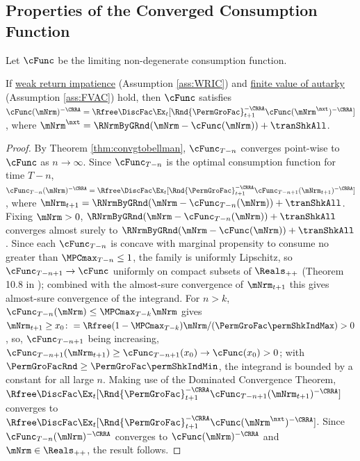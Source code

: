 \documentclass[\econtexRoot/BufferStockTheory]{subfiles}
\begin{document}
\subsection{Properties of the Converged Consumption Function}\label{subsec:Properties}

Let $\cFunc$ be the limiting non-degenerate consumption function.

\begin{claim}\label{eq:EuelrStatC}
If \hyperlink{WRIC}{weak return impatience} (Assumption \ref{ass:WRIC}) and \hyperlink{FVAC}{finite value of autarky} (Assumption \ref{ass:FVAC}) hold, then $\cFunc$ satisfies $\cFunc(\mNrm)^{-\CRRA}   = \Rfree \DiscFac \Ex_{t}[ \Rnd{\PermGroFac}_{t+1}^{-\CRRA} \cFunc(\mNrm^{\nxt})^{-\CRRA}]$, where ${\mNrm}^{\nxt} = \RNrmByGRnd(\mNrm -\cFunc(\mNrm)) +\tranShkAll$. 
\end{claim}
\begin{proof}
By Theorem \ref{thm:convgtobellman}, $\cFunc_{T-n}$ converges point-wise to $\cFunc$ as $n\rightarrow \infty$.
Since $\cFunc_{T-n}$ is the optimal consumption function for time $T-n$, $\cFunc_{T-n}(\mNrm)^{-\CRRA}   = \Rfree \DiscFac \Ex_{t}[ \Rnd{\PermGroFac}_{t+1}^{-\CRRA} \cFunc_{T-n+1}(\mNrm_{t+1})^{-\CRRA}]$, where ${\mNrm}_{t+1} = \RNrmByGRnd(\mNrm -\cFunc_{T-n}(\mNrm)) +\tranShkAll$.
Fixing $\mNrm>0$, $\RNrmByGRnd(\mNrm -\cFunc_{T-n}(\mNrm)) +\tranShkAll$ converges almost surely to $ \RNrmByGRnd(\mNrm -\cFunc(\mNrm)) +\tranShkAll$.
Since each $\cFunc_{T-n}$ is concave with marginal propensity to consume no greater than $\MPCmax_{T-n}\leq 1$, the family is uniformly Lipschitz, so $\cFunc_{T-n+1}\rightarrow \cFunc$ uniformly on compact subsets of $\Reals_{++}$ (Theorem 10.8 in \cite{Rockafellar1972}); combined with the almost-sure convergence of $\mNrm_{t+1}$ this gives almost-sure convergence of the integrand.
For $n>k$, $\cFunc_{T-n}(\mNrm)\leq\MPCmax_{T-k}\mNrm$ gives $\mNrm_{t+1}\geq x_{0}\colon=\Rfree(1-\MPCmax_{T-k})\mNrm/(\PermGroFac\permShkIndMax)>0$, so, $\cFunc_{T-n+1}$ being increasing, $\cFunc_{T-n+1}(\mNrm_{t+1})\geq\cFunc_{T-n+1}(x_{0})\rightarrow\cFunc(x_{0})>0$; with $\PermGroFacRnd\geq\PermGroFac\permShkIndMin$, the integrand is bounded by a constant for all large $n$.
Making use of the Dominated Convergence Theorem, $\Rfree \DiscFac \Ex_{t}[ \Rnd{\PermGroFac}_{t+1}^{-\CRRA} \cFunc_{T-n+1}(\mNrm_{t+1})^{-\CRRA}]$ converges to $ \Rfree \DiscFac \Ex_{t}[ \Rnd{\PermGroFac}_{t+1}^{-\CRRA} \cFunc(\mNrm^{\nxt})^{-\CRRA}]$.
Since $\cFunc_{T-n}(\mNrm)^{-\CRRA}$ converges to $\cFunc(\mNrm)^{-\CRRA}$ and $\mNrm\in \Reals_{++}$, the result follows.

\end{proof}
\end{document}
